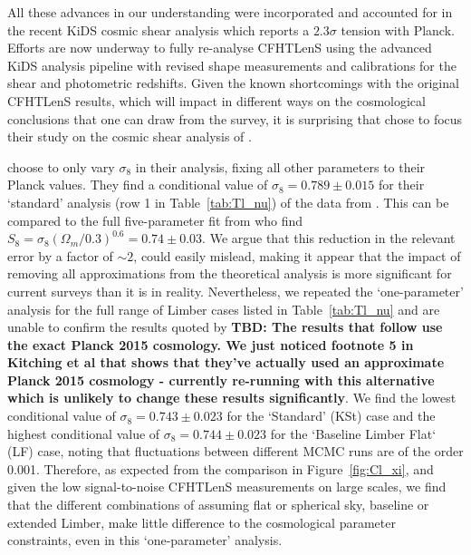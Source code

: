 All these advances in our understanding were incorporated and accounted for in the recent KiDS cosmic shear analysis \citep{hildebrandt/etal:2016} which reports a $2.3 \sigma$ tension with Planck.  Efforts are now underway to fully re-analyse CFHTLenS using the advanced KiDS analysis pipeline with revised shape measurements and calibrations for the shear and photometric redshifts.  Given the known shortcomings with the original CFHTLenS results, which will impact in different ways on the cosmological conclusions that one can draw from the survey, it is surprising that \citet{kitching/etal:2016} chose to focus their study on the cosmic shear analysis of \citet{kilbinger/etal:2013}.  

\citet{kitching/etal:2016} choose to only vary $\sigma_8$ in their analysis, fixing all other parameters to their Planck values. They find a conditional value of $\sigma_8 = 0.789 \pm 0.015$ for their `standard' analysis (row 1 in Table~\ref{tab:Tl_nu}) of the data from \citet{kilbinger/etal:2013}.    This can be compared to the full five-parameter fit from \citet{kilbinger/etal:2013} who find $S_8=\sigma_8(\Omega_m/0.3)^{0.6} = 0.74 \pm 0.03$.   We argue that this reduction in the relevant error by a factor of $\sim 2$, could easily mislead, making it appear that the impact of removing all approximations from the theoretical analysis is more significant for current surveys than it is in reality.  Nevertheless, we repeated the `one-parameter' analysis for the full range of Limber cases listed in Table~\ref{tab:Tl_nu} and are unable to confirm the results quoted by \citet{kitching/etal:2016} {\bf TBD:  The results that follow use the exact Planck 2015 cosmology.  We just noticed footnote 5 in Kitching et al that shows that they've actually used an approximate Planck 2015 cosmology - currently re-running with this alternative which is unlikely to change these results significantly}.  We find the lowest conditional value of $\sigma_8 = 0.743 \pm 0.023$ for the `Standard' (KSt) case and the highest conditional value of $\sigma_8 = 0.744 \pm 0.023$ for the `Baseline Limber Flat` (LF) case, noting that fluctuations between different MCMC runs are of the order 0.001.  Therefore, as expected from the comparison in Figure~\ref{fig:Cl_xi}, and given the low signal-to-noise CFHTLenS measurements on large scales, we find that the different combinations of assuming flat or spherical sky, baseline or extended Limber, make little difference to the cosmological parameter constraints, even in this `one-parameter' analysis.    

